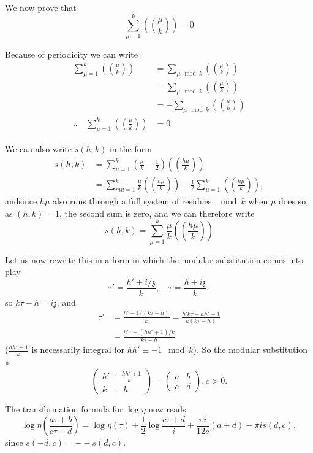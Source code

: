 We now prove that
$$
\sum^k_{\mu=1} \left( \left( \frac{\mu}{k}\right) \right)=0
$$

Because of periodicity we can write
\begin{align*}
  \sum^k_{\mu=1} \left( \left( \frac{\mu}{k}\right) \right) & =
  \sum_{\mu \mod k} \left( \left( \frac{\mu}{k}\right) \right)\\
  & = \sum_{\mu \mod k} \left(\left(\frac{\mu}{k} \right)\right)\\
  & = - \sum_{\mu \mod k} \left( \left(\frac{\mu}{k} \right) \right)\\
  \therefore \quad \sum^k_{\mu =1} \left( \left( \frac{\mu}{k} \right)
  \right) & =0
\end{align*}

We can also write $s(h, k)$ in the form
\begin{align*}
  s(h, k) & = \sum^k_{\mu=1} \left( \frac{\mu}{k} - \frac{1}{2}\right)
  \left( \left( \frac{h \mu}{k}\right) \right) \\
  & = \sum^k_{mu=1} \frac{\mu}{k} \left( \left( \frac{h \mu}{k}
  \right) \right) - \frac{1}{2} \sum^k_{\mu=1} \left( \left(\frac{h
    \mu}{k}  \right) \right),
\end{align*}
and\pageoriginale since $h \mu$ also runs through a full system of
residues $\mod k$ when $\mu$ does so, as $(h, k)=1$, the second sum is
zero, and we can therefore write
$$
s(h, k) = \sum^k_{\mu=1} \frac{\mu}{k} \left( \left( \frac{h
  \mu}{k}\right) \right) 
$$

Let us now rewrite this in a form in which the modular substitution
comes into play
$$
\tau' = \frac{h' + i /\mathfrak{z}}{k}, \quad \tau= \frac{h + i
  \mathfrak{z}}{k}; 
$$
so $k \tau - h = i \mathfrak{z}$, and 
\begin{align*}
  \tau' & = \frac{h' - 1/(k \tau -h)}{k} = \frac{h' k \tau - h h'-1}{k
    (k \tau -h)} \\
  & = \frac{h' \tau - (h h'+1)/k}{k \tau-h} 
\end{align*}
($\frac{h h'+1}{k}$ is necessarily integral for $h h' \equiv -1 \mod
k$). So the modular substitution is 
$$
\begin{pmatrix}
  h' & \frac{-hh'+1}{k}\\
  k & -h
\end{pmatrix}= 
\begin{pmatrix}
  a & b\\
  c & d
\end{pmatrix}, c > 0.
$$

The transformation formula for $\log \eta$ now reads
$$
\log \eta \left( \frac{a \tau+ b}{c \tau+d}\right) = \log \eta (\tau)
+ \frac{1}{2} \log \frac{c \tau +d}{i} + \frac{\pi i}{12c} (a+d) - \pi
i s (d, c),
$$
since $s(-d, c)=- -s(d, c)$.

